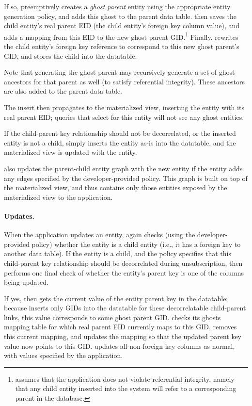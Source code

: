 If so, \name preemptively creates a \emph{ghost parent} entity using the appropriate entity
generation policy, and adds this ghost to the parent data table. \name then saves the child
entity's real parent EID (the child entity's foreign key column value), and adds a mapping from this
EID to the new ghost parent GID.\footnote{\name assumes that the application does not violate
referential integrity, namely that any child entity inserted into the system will refer to a
corresponding parent in the database.} Finally, \name rewrites the child entity's foreign key
reference to correspond to this new ghost parent's GID, and stores the child into the datatable.

Note that generating the ghost parent may recursively generate a set of ghost ancestors for that
parent as well (to satisfy referential integrity). These ancestors are also added to the parent data
table.

The insert then propagates to the materialized view, inserting the entity with its real parent EID; queries that
select for this entity will not see any ghost entities. 

If the child-parent key relationship should not be decorrelated, or the inserted entity is not a
child, \name simply inserts the entity as-is into the datatable, and the materialized view is
updated with the entity.

\name also updates the parent-child entity graph with the new entity if the entity adds any edges
specified by the developer-provided policy. This graph is built on top of the materialized view, and
thus contains only those entities exposed by the materialized view to the application.

\paragraph{Updates.}
When the application updates an entity, \name again checks (using the developer-provided policy) whether
the entity is a child entity (i.e., it has a foreign key to another data table). 
If the entity is a child, and the policy specifies that this child-parent key
relationship should be decorrelated during unsubscription, then \name performs one final check of
whether the entity's parent key is one of the columns being updated.

If yes, then \name gets the current value of the entity parent key in the datatable: because \name
inserts only GIDs into the datatable for these decorrelatable child-parent links, this value 
corresponds to some ghost parent GID.
\name checks its ghosts mapping table for which real parent EID currently maps to this GID, removes
this current mapping, and updates the mapping so that the updated parent key value now points to
this GID.
\name updates all non-foreign key columns as normal, with values specified by the application.

